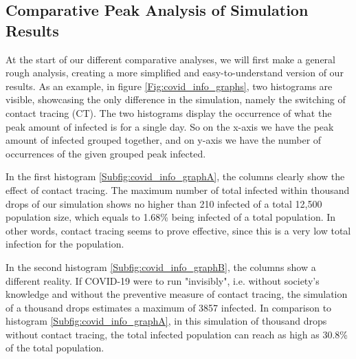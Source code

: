 \subsection{Comparative Peak Analysis of Simulation Results}

At the start of our different comparative analyses, we will first make a general rough analysis, creating a more simplified and easy-to-understand version of our results. As an example, in figure \ref{Fig:covid_info_graphs}, two histograms are visible, showcasing the only difference in the  simulation, namely the switching of contact tracing (CT). The two histograms display the occurrence of what the peak amount of infected is for a single day. So on the x-axis we have the peak amount of infected grouped together, and on y-axis we have the number of occurrences of the given grouped peak infected.

In the first histogram \ref{Subfig:covid_info_graphA}, the columns clearly show the effect of contact tracing. The maximum number of total infected within thousand drops of our simulation shows no higher than 210 infected of a total 12,500 population size, which equals to 1.68\% being infected of a total population. In other words, contact tracing seems to prove effective, since this is a very low total infection for the population. 

In the second histogram \ref{Subfig:covid_info_graphB}, the columns show a different reality. If COVID-19 were to run "invisibly", i.e. without society's knowledge and without the preventive measure of contact tracing, the simulation of a thousand drops estimates a maximum of 3857 infected. In comparison to histogram \ref{Subfig:covid_info_graphA}, in this simulation of thousand drops without contact tracing, the total infected population can reach as high as 30.8\% of the total population. 

